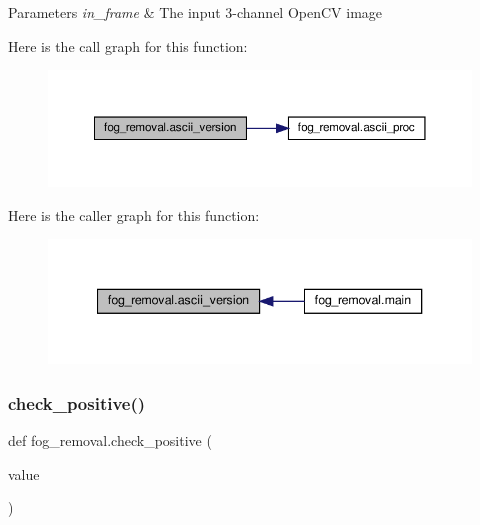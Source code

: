 \begin{DoxyParams}{Parameters}
{\em in\+\_\+frame} & The input 3-\/channel Open\+CV image \\
\hline
\end{DoxyParams}
Here is the call graph for this function\+:
\nopagebreak
\begin{figure}[H]
\begin{center}
\leavevmode
\includegraphics[width=350pt]{namespacefog__removal_a6e25df53e59d9d8848b5e2ed5a399ea3_cgraph}
\end{center}
\end{figure}
Here is the caller graph for this function\+:
\nopagebreak
\begin{figure}[H]
\begin{center}
\leavevmode
\includegraphics[width=340pt]{namespacefog__removal_a6e25df53e59d9d8848b5e2ed5a399ea3_icgraph}
\end{center}
\end{figure}
\mbox{\label{namespacefog__removal_a7ea01fc3bbbb26aa0f4d20724849308c}} 
\subsubsection{\texorpdfstring{check\+\_\+positive()}{check\_positive()}}
{\footnotesize\ttfamily def fog\+\_\+removal.\+check\+\_\+positive (\begin{DoxyParamCaption}\item[{}]{value }\end{DoxyParamCaption})}




